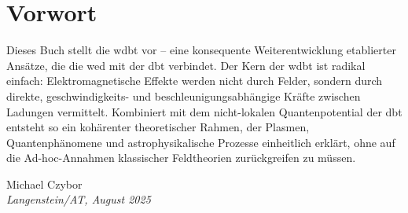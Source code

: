 \documentclass[11pt, a5paper, twoside, openright]{book}
\begin{document}
\chapter*{Vorwort}
Dieses Buch stellt die \gls{wdbt} vor – eine konsequente Weiterentwicklung etablierter Ansätze, die die \gls{wed} mit der \gls{dbt} verbindet. Der Kern der \gls{wdbt} ist radikal einfach:
Elektromagnetische Effekte werden nicht durch Felder, sondern durch direkte, geschwindigkeits- und beschleunigungsabhängige Kräfte zwischen Ladungen vermittelt. Kombiniert mit dem nicht-lokalen
Quantenpotential der \gls{dbt} entsteht so ein kohärenter theoretischer Rahmen, der Plasmen, Quantenphänomene und astrophysikalische Prozesse einheitlich erklärt, ohne auf die Ad-hoc-Annahmen
klassischer Feldtheorien zurückgreifen zu müssen.

\begin{flushright}
    Michael Czybor \\
    \emph{Langenstein/AT, August 2025}
\end{flushright}

\tableofcontents
\listoffigures
\listoftables

\mainmatter








\appendix


\backmatter
\printbibliography[title=Literaturverzeichnis]
\glswritefiles
\printglossary[title=Glossar]
\printglossary[type=acronym, title=Abkürzungen]
\end{document}
